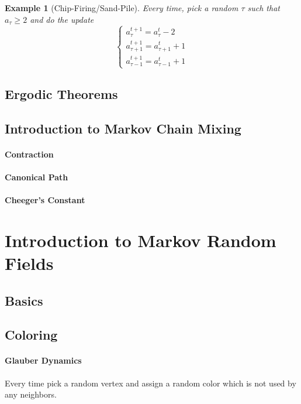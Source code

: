 \documentclass{article}
\newtheorem{Eg}{Example}[section]
\theoremstyle{definition}
\begin{document}
\begin{Eg}[Chip-Firing/Sand-Pile]
    Every time, pick a random $\tau$ such that $a_\tau\geq 2$ and do the update 
    \[\left\{\begin{matrix}
        a_\tau^{t+1} = a_\tau^{t} -2 \\
        a_{\tau+1}^{t+1}= a_{\tau+1}^{t}+1  \\
        a_{\tau-1}^{t+1}= a_{\tau-1}^{t}+1
        \end{matrix}\right.\]
\end{Eg}

\subsection{Ergodic Theorems}

\subsection{Introduction to Markov Chain Mixing}

\paragraph{Contraction}

\paragraph{Canonical Path}

\paragraph{Cheeger's Constant}


\section{Introduction to Markov Random Fields}
\subsection{Basics}


\subsection{Coloring}

\paragraph{Glauber Dynamics}
Every time pick a random vertex and assign a random color which is not used by any neighbors.
\end{document}
